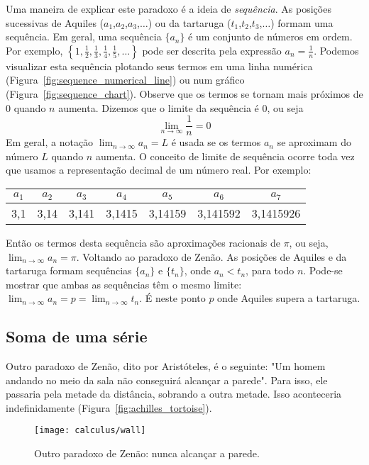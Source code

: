 \noindent Uma maneira de explicar este paradoxo é a ideia de \emph{sequência}. As posições sucessivas de Aquiles ($a_1$,$a_2$,$a_3$,$\dots$) ou da tartaruga ($t_1$,$t_2$,$t_3$,$\dots$) formam uma sequência. Em geral, uma sequência $\{a_n\}$ é um conjunto de números em ordem. Por exemplo, $\left\{1,\frac{1}{2},\frac{1}{3},\frac{1}{4},\frac{1}{5},\dots\right\}$ pode ser descrita pela expressão $a_n=\frac{1}{n}$. Podemos visualizar esta sequência plotando seus termos em uma linha numérica (Figura~\ref{fig:sequence_numerical_line}) ou num gráfico (Figura~\ref{fig:sequence_chart}). Observe que os termos se tornam mais próximos de 0 quando $n$ aumenta. Dizemos que o limite da sequência é 0, ou seja $$\lim_{n\rightarrow\infty}\frac{1}{n}=0$$
Em geral, a notação $\lim_{n\rightarrow\infty}a_n=L$ é usada se os termos $a_n$ se aproximam do número $L$ quando $n$ aumenta.
O conceito de limite de sequência ocorre toda vez que usamos a representação decimal de um número real. Por exemplo:
\begin{table}[!ht]
  \vspace{-0.3cm}
  \centering
  \setlength\tabcolsep{0.15cm}
  \begin{tabular}{|c|c|c|c|c|c|c|}\hline
    $a_1$&$a_2$&$a_3$&$a_4$&$a_5$&$a_6$&$a_7$\\\hline
    3,1&3,14&3,141&3,1415&3,14159&3,141592&3,1415926\\\hline
  \end{tabular}
  \vspace{-0.3cm}
\end{table}

\noindent Então os termos desta sequência são aproximações racionais de $\pi$, ou seja, $\lim_{n\rightarrow \infty}a_n=\pi$. Voltando ao paradoxo de Zenão. As posições de Aquiles e da tartaruga formam sequências $\{a_n\}$ e $\{t_n\}$, onde $a_n<t_n$, para todo $n$. Pode-se mostrar que ambas as sequências têm o mesmo limite: $\lim_{n\rightarrow\infty}a_n=p=\lim_{n\rightarrow\infty}t_n$. É neste ponto $p$ onde Aquiles supera a tartaruga.

\subsection{Soma de uma série}
Outro paradoxo de Zenão, dito por Aristóteles, é o seguinte: "Um homem andando no meio da sala não conseguirá alcançar a parede". Para isso, ele passaria pela metade da distância, sobrando a outra metade. Isso aconteceria indefinidamente (Figura~\ref{fig:achilles_tortoise}).
\begin{figure}[!ht]
  \vspace{-0.3cm}
	\centering
	\texttt{[image: calculus/wall]}
	\caption{Outro paradoxo de Zenão: nunca alcançar a parede.}
  \vspace{-0.3cm}
\end{figure}

